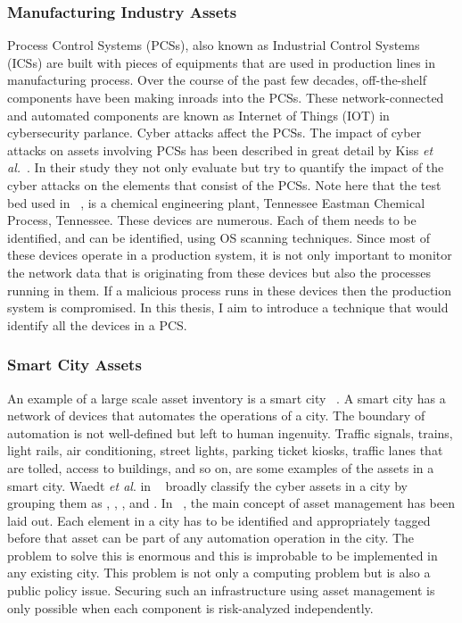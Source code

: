 \subsubsection{Manufacturing Industry Assets}\label{sec:manu}
Process Control Systems (PCSs), also known as Industrial Control Systems (ICSs) are built with pieces of equipments that are used in production lines in manufacturing process. Over the course of the past few decades, off-the-shelf components have been making inroads into the PCSs. These network-connected and automated components are known as Internet of Things (IOT) in cybersecurity parlance. Cyber attacks affect the PCSs. The impact of cyber attacks on assets involving PCSs has been described in great detail by Kiss \textit{et al.}~\cite{7145073}. In their study they not only evaluate but try to quantify the impact of the cyber attacks on the elements that consist of the PCSs. Note here that the test bed used in ~\cite{7145073}, is a chemical engineering plant, Tennessee Eastman Chemical Process, Tennessee. These devices are numerous. Each of them needs to be identified, and can be identified, using OS scanning techniques. Since most of these devices operate in a production system, it is not only important to monitor the network data that is originating from these devices but also the processes running in them. If a malicious process runs in these devices then the production system is compromised. In this thesis, I aim to introduce a technique that would identify all the devices in a PCS.\\

\subsubsection{Smart City Assets}\label{sec:smcity}
An example of a large scale asset inventory is a smart city ~\cite{7580812}. A smart city has a network of devices that automates the operations of a city. The boundary of automation is not well-defined but left to human ingenuity. Traffic signals, trains, light rails, air conditioning, street lights, parking ticket kiosks, traffic lanes that are tolled, access to buildings, and so on, are some examples of the assets in a smart city. Waedt \textit{et al}. in ~\cite{7580812} broadly classify the cyber assets in a city by grouping them as , , , and . In ~\cite[Figure 3]{7580812}, the main concept of asset management has been laid out. Each element in a city has to be identified and appropriately tagged before that asset can be part of any automation operation in the city. The problem to solve this is enormous and this is improbable to be implemented in any existing city. This problem is not only a computing problem but is also a public policy issue. Securing such an infrastructure using asset management is only possible when each component is risk-analyzed independently. \\ 

